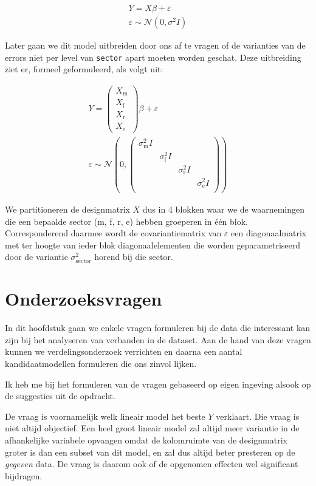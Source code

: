 \documentclass[a4paper]{report}
\begin{document}
  \begin{align}
  Y = X\beta + \varepsilon \\
  \varepsilon \sim \mathcal{N}(0,\sigma^2I)
  \end{align}
  
  Later gaan we dit model uitbreiden door ons af te vragen of de varianties van de errors niet per level van \verb!sector! apart moeten worden geschat. Deze uitbreiding ziet er, formeel geformuleerd, als volgt uit:
  
  \begin{align}
  Y = \begin{pmatrix} X_{\text{m}}  \\ X_{\text{f}} \\ X_{\text{r}} \\ X_{\text{e}} \end{pmatrix}\beta + \varepsilon \\
  \varepsilon \sim \mathcal{N}(0,
  \begin{pmatrix} 
  \sigma_{\text{m}}^2I & & & \\ 
  & \sigma_{\text{f}}^2I & & \\ 
  & & \sigma_{\text{r}}^2I & \\
  & & & \sigma_{\text{e}}^2I \\
  \end{pmatrix})
  \end{align}
  
  We partitioneren de designmatrix $X$ dus in 4 blokken waar we de waarnemingen die een bepaalde sector (m, f, r, e) hebben groeperen in \' e\' en blok. Corresponderend daarmee wordt de covariantiematrix van $\varepsilon$ een diagonaalmatrix met ter hoogte van ieder blok diagonaalelementen die worden geparametriseerd door de variantie $\sigma_{\text{sector}}^2$ horend bij die sector.

\section{Onderzoeksvragen}
  In dit hoofdstuk gaan we enkele vragen formuleren bij de data die interessant kan zijn bij het analyseren van verbanden in de dataset. Aan de hand van deze vragen kunnen we verdelingsonderzoek verrichten en daarna een aantal kandidaatmodellen formuleren die ons zinvol lijken.
  
  Ik heb me bij het formuleren van de vragen gebaseerd op eigen ingeving alsook op de suggesties uit de opdracht.  
  
  De vraag is voornamelijk welk lineair model het beste $Y$ verklaart. Die vraag is niet altijd objectief. Een heel groot lineair model zal altijd meer variantie in de afhankelijke variabele opvangen omdat de kolomruimte van de designmatrix groter is dan een subset van dit model, en zal dus altijd beter presteren op de \emph{gegeven} data. De vraag is daarom ook of de opgenomen effecten wel significant bijdragen.
  
\end{document}
